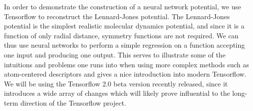 In order to demonstrate the construction of a neural network
potential, we use Tensorflow to reconstruct the Lennard-Jones
potential. The Lennard-Jones potential is the simplest
realistic molecular dynamics potential, and since it is a function
of only radial distance, symmetry functions are not required.
We can thus use neural networks to perform a simple regression
on a function accepting one input and producing one output.
This serves to illustrate some of the intuitions and problems
one runs into when using more complex methods such as 
atom-centered descriptors and gives a nice introduction into
modern Tensorflow. We will be using the Tensorflow 2.0
beta version recently released, since it introduces a wide array
of changes which will likely prove influential to the long-term
direction of the Tensorflow project.
